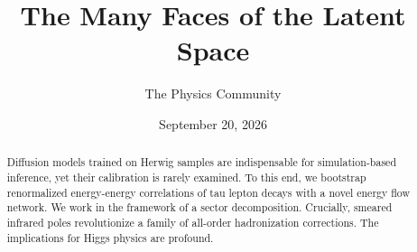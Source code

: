 \documentclass[11pt]{article}
\title{The Many Faces of the Latent Space}
\author{The Physics Community}
\date{September 20, 2026}
\numberwithin{equation}{section}
\theoremstyle{definition}
\theoremstyle{remark}
\begin{document}
\maketitle
\begin{abstract}
Diffusion models trained on Herwig samples are indispensable for
simulation-based inference, yet their calibration is rarely examined. To
this end, we bootstrap renormalized energy-energy correlations of tau
lepton decays with a novel energy flow network. We work in the framework
of a sector decomposition. Crucially, smeared infrared poles
revolutionize a family of all-order hadronization corrections. The
implications for Higgs physics are profound.
\end{abstract}
\tableofcontents





\nocite{*}


\end{document}
